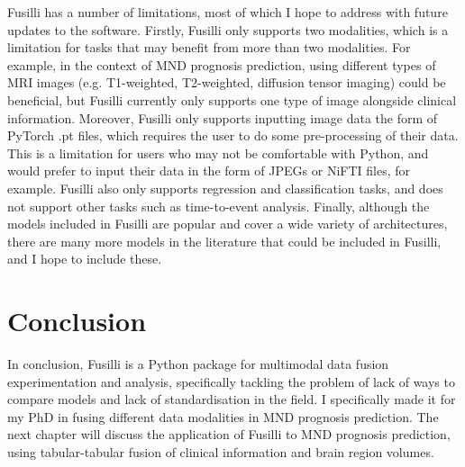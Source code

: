 Fusilli has a number of limitations, most of which I hope to address with future updates to the software.
Firstly, Fusilli only supports two modalities, which is a limitation for tasks that may benefit from more than two modalities.
For example, in the context of MND prognosis prediction, using different types of MRI images (e.g. T1-weighted, T2-weighted, diffusion tensor imaging) could be beneficial, but Fusilli currently only supports one type of image alongside clinical information.
Moreover, Fusilli only supports inputting image data the form of PyTorch .pt files, which requires the user to do some pre-processing of their data.
This is a limitation for users who may not be comfortable with Python, and would prefer to input their data in the form of JPEGs or NiFTI files, for example.
Fusilli also only supports regression and classification tasks, and does not support other tasks such as time-to-event analysis.
Finally, although the models included in Fusilli are popular and cover a wide variety of architectures, there are many more models in the literature that could be included in Fusilli, and I hope to include these.

\section{Conclusion}
In conclusion, Fusilli is a Python package for multimodal data fusion experimentation and analysis, specifically tackling the problem of lack of ways to compare models and lack of standardisation in the field.
I specifically made it for my PhD in fusing different data modalities in MND prognosis prediction.
The next chapter will discuss the application of Fusilli to MND prognosis prediction, using tabular-tabular fusion of clinical information and brain region volumes.
